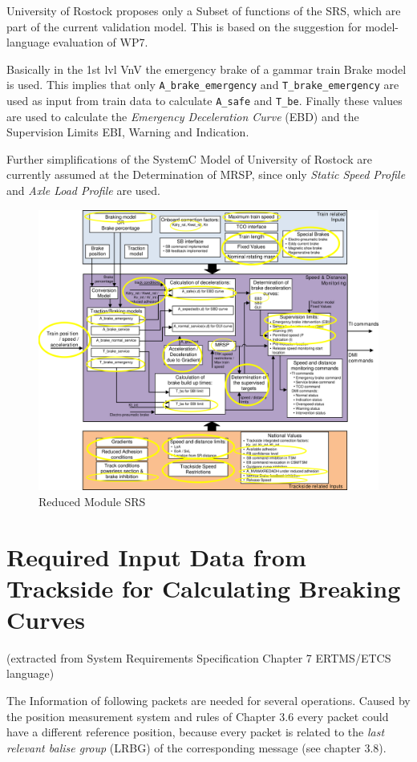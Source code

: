 \documentclass{template/openetcs_article}
\begin{document}
University of Rostock proposes only a Subset of functions of the SRS, which are part of the current validation model. This is based on the suggestion for model-language evaluation of WP7.

Basically in the 1st lvl VnV the emergency brake of a gammar train Brake model is used. This implies that only \texttt{A\_brake\_emergency} and \texttt{T\_brake\_emergency} are used as input from train data to calculate \texttt{A\_safe} and \texttt{T\_be}. Finally these values are used to calculate the \emph{Emergency Deceleration Curve} (EBD) and the Supervision Limits EBI, Warning and Indication.

Further simplifications of the SystemC Model of University of Rostock are currently assumed at the Determination of MRSP, since only \emph{Static Speed Profile} and  \emph{Axle Load Profile} are used.
 

\begin{figure}[htb]
  \centering
  \includegraphics[width=.9\textwidth]{images/reduced_Module_SRS.png}
  \caption{Reduced Module SRS}
  \label{fig:openETCSProcess}
\end{figure}


\section{Required Input Data from Trackside for Calculating Breaking Curves}
(extracted from System Requirements Specification Chapter 7 ERTMS/ETCS language)


The Information of following packets are needed for several operations. Caused by the position measurement system and rules of Chapter 3.6 every packet could have a different reference position, because every packet is related to the \emph{last relevant balise group} (LRBG) of the corresponding message (see chapter 3.8). 
\end{document}
